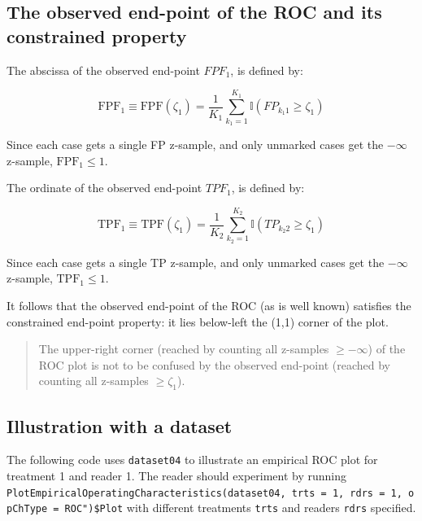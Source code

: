 \documentclass[
]{book}
\begin{document}
\hypertarget{empirical-ROC-constrained}{%
\subsection{The observed end-point of the ROC and its constrained property}\label{empirical-ROC-constrained}}

The abscissa of the observed end-point \(FPF_1\), is defined by:

\begin{equation}
\text{FPF}_1 \equiv \text{FPF} \left ( \zeta_1 \right ) = \frac{1}{K_1} \sum_{k_1=1}^{K_1} \mathbb{I} \left ( FP_{k_1 1} \geq \zeta_1 \right )
\label{eq:empirical-fpf-repeat}
\end{equation}

Since each case gets a single FP z-sample, and only unmarked cases get the \(-\infty\) z-sample, \(\text{FPF}_1 \leq 1\).

The ordinate of the observed end-point \(TPF_1\), is defined by:

\begin{equation}
\text{TPF}_1 \equiv \text{TPF}(\zeta_1) = \frac{1}{K_2}\sum_{k_2=1}^{K_2} \mathbb{I}\left ( TP_{k_2 2} \geq \zeta_1 \right )
\label{eq:empirical-TPF-repeat}
\end{equation}

Since each case gets a single TP z-sample, and only unmarked cases get the \(-\infty\) z-sample, \(\text{TPF}_1 \leq 1\).

It follows that the observed end-point of the ROC (as is well known) satisfies the constrained end-point property: it lies below-left the (1,1) corner of the plot.

\begin{quote}
The upper-right corner (reached by counting all z-samples \(\ge -\infty\)) of the ROC plot is not to be confused by the observed end-point (reached by counting all z-samples \(\ge \zeta_1\)).
\end{quote}

\hypertarget{empirical-roc-plot-illustration}{%
\subsection{Illustration with a dataset}\label{empirical-roc-plot-illustration}}

The following code uses \texttt{dataset04} to illustrate an empirical ROC plot for treatment 1 and reader 1. The reader should experiment by running \texttt{PlotEmpiricalOperatingCharacteristics(dataset04,\ trts\ =\ 1,\ rdrs\ =\ 1,\ opChType\ =\ ROC")\$Plot} with different treatments \texttt{trts} and readers \texttt{rdrs} specified.
\end{document}
